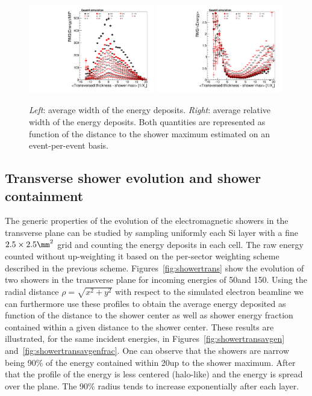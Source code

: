 \begin{figure}[h!]
  \begin{center}
    \includegraphics[width=0.49\textwidth]{figures/version_3_cenunc}
    \includegraphics[width=0.49\textwidth]{figures/version_3_crelunc}
    \caption{{\em Left}: average width of the energy deposits.
    {\em Right}: average relative width of the energy deposits. Both
    quantities are represented as
    function of the distance to the shower maximum estimated on an event-per-event basis.
   }
    \label{fig:longprofilesunc}
  \end{center}
\end{figure}


\subsection{Transverse shower evolution and shower containment}
\label{subsec:transvevol}

The generic properties of the evolution of the electromagnetic showers
in the transverse plane can be studied by sampling uniformly each Si
layer with a fine $2.5\times2.5\mm^2$ grid and counting the energy
deposits in each cell. The raw energy counted without up-weighting it based on
the per-sector weighting scheme described in the previous scheme.
Figures~\ref{fig:showertrans} show the evolution of two showers in the
transverse plane for incoming energies of 50\GeV and 150\GeV.
Using the radial distance $\rho=\sqrt{x^2+y^2}$ with respect to the
simulated electron beamline we can furthermore use these profiles to
obtain the average energy deposited as function of the distance to the
shower center as well as shower energy fraction contained within a
given distance to the shower center.
These results are illustrated, for the same incident energies, in
Figures~\ref{fig:showertransavgen} and~\ref{fig:showertransavgenfrac}.
One can observe that the showers are narrow being 90\% of the energy
contained within 20\cm up to the shower maximum. After that the
profile of the energy is less centered (halo-like) and the energy is
spread over the plane. The 90\% radius tends to increase exponentially
after each layer.

